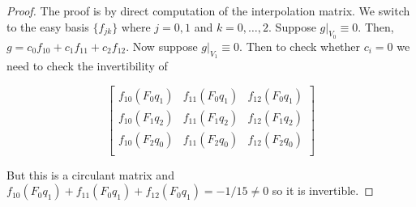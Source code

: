 \documentclass[12pt]{amsart}
\theoremstyle{plain}
\theoremstyle{definition}
\begin{document}
\begin{proof}
The proof is by direct computation of the interpolation matrix. We switch to the easy basis $\{f_{jk}\}$ where $j=0,1$ and $k=0,\ldots,2$. Suppose $g|_{V_0} \equiv 0$. Then, $g = c_0f_{10} + c_1f_{11} + c_2f_{12}$. Now suppose $g|_{V_1} \equiv 0$. Then to check whether $c_i = 0$ we need to check the invertibility of

$$ \begin{bmatrix}
f_{10}(F_0q_1) & f_{11}(F_0q_1) & f_{12}(F_0q_1) \\
f_{10}(F_1q_2) & f_{11}(F_1q_2) & f_{12}(F_1q_2) \\
f_{10}(F_2q_0) & f_{11}(F_2q_0) & f_{12}(F_2q_0)\\
\end{bmatrix}$$

But this is a circulant matrix and $f_{10}(F_0q_1) + f_{11}(F_0q_1) + f_{12}(F_0q_1) = -1/15 \neq 0$ so it is invertible. 

\end{proof}
\end{document}
